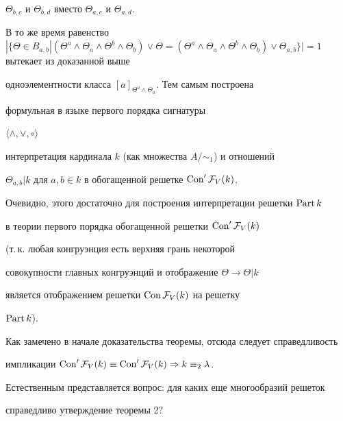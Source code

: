 \begin{pf}
$\Theta_{b,c}$ и $\Theta_{b,d}$ вместо $\Theta_{a,c}$ и $\Theta_{a,d}$.


В то же время равенство $|\{\Theta\in B_{a,b}|(\Theta^a\wedge\Theta_a


\wedge\Theta^b\wedge\Theta_b)\vee\Theta=(\Theta^a\wedge\Theta_a\wedge\Theta^b


\wedge\Theta_b)\vee\Theta_{a,b}\}|=1$ вытекает из доказанной выше


одноэлементности класса $[a]_{\Theta^a\wedge\Theta_a}$. Тем самым построена


формульная в языке первого порядка сигнатуры


$\langle\wedge,\vee,\circ\rangle$


интерпретация кардинала $k$ (как множества $A/{\sim}_1$) и отношений


$\Theta_{a,b}|k$ для $a,b\in k$ в обогащенной решетке $\operatorname{Con} '{\cal F}_V(k)$.


Очевидно, этого достаточно для построения интерпретации решетки $\operatorname{Part} k$


в теории первого порядка обогащенной решетки $\operatorname{Con} '{\cal F}_V(k)$


(т.\,к. любая конгруэнция есть верхняя грань некоторой


совокупности главных конгруэнций и отображение $\Theta\rightarrow\Theta|k$ 


является отображением решетки $\operatorname{Con}{\cal F}_V(k)$ на решетку 


$\operatorname{Part} k$).


Как замечено в начале доказательства теоремы, отсюда следует справедливость


импликации $\Con '{\cal F}_V(k)\equiv \Con '{\cal F}_V(k)\Rightarrow k


\equiv_2\lambda$.


\end{pf}





Естественным представляется вопрос: для каких еще многообразий решеток


справедливо утверждение теоремы 2?








